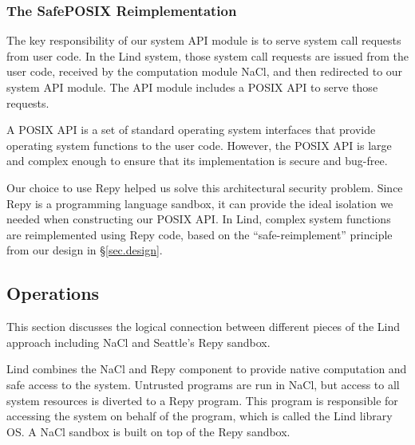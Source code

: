 
\subsubsection{The SafePOSIX Reimplementation}

The key responsibility of our system API module is to serve system call requests from user code. 
In the Lind system, those system call requests are issued from the user code, 
received by the computation module NaCl, and then redirected to our system API module. 
The API module includes a POSIX API to serve those requests. 

A POSIX API is a set of standard operating system interfaces that provide operating system functions 
to the user code. However, the POSIX API is large and complex enough to ensure that its implementation is secure and bug-free. 

Our choice to use Repy helped us solve this architectural security problem. 
Since Repy is a programming language sandbox, it can provide the ideal isolation 
we needed when constructing our POSIX API. In Lind, 
complex system functions are reimplemented using Repy code, 
based on the ``safe-reimplement'' principle from our design in \S{\ref{sec.design}}.

\subsection{Operations}

This section discusses the logical connection between different pieces of the Lind approach including NaCl and Seattle's Repy sandbox.

Lind combines the NaCl and Repy component to provide native computation and 
safe access to the system. Untrusted programs are run in NaCl, 
but access to all system resources is diverted to a Repy program. 
This program is responsible for accessing the system on behalf of the program, 
which is called the Lind library OS. A NaCl sandbox is built on top of the Repy sandbox. 

